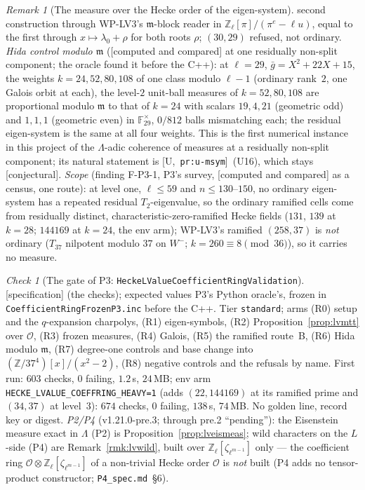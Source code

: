 \documentclass[11pt]{article}
\theoremstyle{remark}
\newtheorem{remark}[theorem]{Remark}
\newtheorem{checkitem}[theorem]{Check}
\newcommand{\F}{\mathbb{F}}
\newcommand{\Z}{\mathbb{Z}}
\newcommand{\m}{\mathfrak{m}}
\newcommand{\CONJ}{\textsf{[conjectural]}}
\newcommand{\CMPD}{\textsf{[computed and compared]}}   %
\newcommand{\SPEC}{\textsf{[specification]}}           %
\newcommand{\Ucite}[1]{[U,~\texttt{#1}]}               %
\begin{document}
\begin{remark}[The measure over the Hecke order of the eigen-system]
second construction through WP-LV3's $\m$-block reader in $\Z_\ell[\pi]/(\pi^{e}-\ell u)$, equal to the first through $x\mapsto\lambda_0+\rho$ for both roots $\rho$; $(30,29)$ refused, not ordinary.
\emph{Hida control modulo $\m$} (\CMPD{} at one residually non-split component; the oracle found it before the C++): at $\ell=29$, $\bar g=X^{2}+22X+15$, the weights $k=24,52,80,108$ of one class
modulo $\ell-1$ (ordinary rank~$2$, one Galois orbit at each), the level-$2$ unit-ball measures of $k=52,80,108$ are proportional modulo $\m$ to that of $k=24$ with scalars $19,4,21$ (geometric odd)
and $1,1,1$ (geometric even) in $\F_{29}^{\times}$, $0/812$ balls mismatching each; the residual eigen-system is the same at all four weights. This is the first numerical instance in this project of
the $\Lambda$-adic coherence of measures at a residually non-split component; its natural statement is \Ucite{pr:u-msym}~(U16), which stays \CONJ.
\emph{Scope} (finding F-P3-1, P3's survey, \CMPD{} as a census, one route): at level one, $\ell\le59$ and $n\le130$--$150$, no ordinary eigen-system has a repeated residual $T_2$-eigenvalue,
so the ordinary ramified cells come from residually distinct, characteristic-zero-ramified Hecke fields ($131$, $139$ at $k=28$; $144169$ at $k=24$, the env arm); WP-LV3's ramified
$(258,37)$ is \emph{not} ordinary ($T_{37}$ nilpotent modulo $37$ on $W^{-}$; $k=260\equiv8\pmod{36}$), so it carries no measure.
\end{remark}

\begin{checkitem}[The gate of P3: \texttt{HeckeLValueCoefficientRingValidation}]\label{chk:lvcoeffring}
\SPEC{} (the checks); expected values P3's Python oracle's, frozen in \texttt{CoefficientRingFrozenP3.inc} before the C++. Tier \texttt{standard}; arms (R0) setup and the $q$-expansion
charpolys, (R1) eigen-symbols, (R2) Proposition~\ref{prop:lvmtt} over $\mathcal O$, (R3) frozen measures, (R4) Galois, (R5) the ramified route~B, (R6) Hida modulo $\m$, (R7) degree-one controls and base
change into $(\Z/37^{4})[x]/(x^{2}-2)$, (R8) negative controls and the refusals by name. First run: $603$ checks, $0$ failing, $1.2$\,s, $24$\,MB; env arm \texttt{HECKE\_LVALUE\_COEFFRING\_HEAVY=1}
(adds $(22,144169)$ at its ramified prime and $(34,37)$ at level~$3$): $674$ checks, $0$ failing, $138$\,s, $74$\,MB. No golden line, record key or digest. \emph{P2/P4} (v1.21.0-pre.3; through
pre.2 ``pending''): the Eisenstein measure exact in $\Lambda$ (P2) is Proposition~\ref{prop:lveismeas}; wild characters on the $L$-side (P4) are Remark~\ref{rmk:lvwild}, built over
$\Z_\ell[\zeta_{\ell^{m-1}}]$ only --- the coefficient ring $\mathcal O\otimes\Z_\ell[\zeta_{\ell^{m-1}}]$ of a non-trivial Hecke order $\mathcal O$ is \emph{not} built (P4 adds no tensor-product
constructor; \texttt{P4\_spec.md}~\S6).
\end{checkitem}
\end{document}

